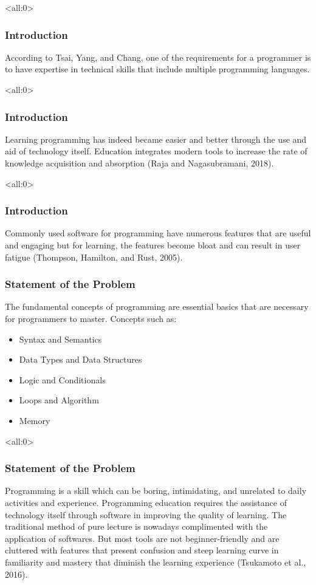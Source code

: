 \documentclass[handout]{beamer}
\newcommand{\parx}{
	\setlength{\parindent}{4em}
	\par}
\begin{document}
\begin{frame}<all:0>
	\frametitle{Introduction}
	\justifying
	\parx
	According to Tsai, Yang, and Chang, one of the requirements for a programmer
	is to have expertise in technical skills that include multiple programming
	languages.
\end{frame}

\begin{frame}<all:0>
	\frametitle{Introduction}
	\justifying
	\parx
	Learning programming has indeed became easier and better through the use and
	aid of technology itself. Education integrates modern tools to increase the
	rate of knowledge acquisition and absorption (Raja and Nagasubramani, 2018).
\end{frame}

\begin{frame}<all:0>
	\frametitle{Introduction}
	\justifying
	\parx
	Commonly used software for programming have numerous features that are useful
	and engaging but for learning, the features become bloat and can result in
	user fatigue (Thompson, Hamilton, and Rust, 2005).
\end{frame}

\begin{frame}
	\frametitle{Statement of the Problem}
	\justifying
	\parx
	The fundamental concepts of programming are essential basics that are necessary
	for programmers to master. Concepts such as:

	\begin{itemize}
			\item<1-> Syntax and Semantics
			\item<2-> Data Types and Data Structures
			\item<3-> Logic and Conditionals
			\item<4-> Loops and Algorithm
			\item<5-> Memory
	\end{itemize}

\end{frame}

\begin{frame}<all:0>
	\frametitle{Statement of the Problem}
	\justifying
	\parx
	Programming is a skill which can be boring, intimidating, and unrelated to
	daily activities and experience. Programming education requires the
	assistance of technology itself through software in improving the quality of
	learning. The traditional method of pure lecture is nowadays complimented
	with the application of softwares. But most tools are not beginner-friendly
	and are cluttered with features that present confusion and steep learning
	curve in familiarity and mastery that diminish the learning experience
	(Tsukamoto et al., 2016).
\end{frame}
\end{document}
